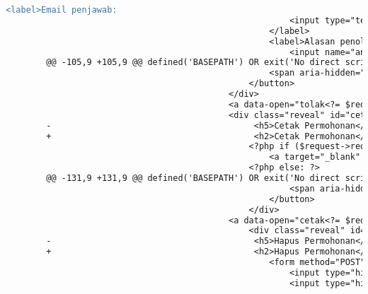 \begin{itemize}
\begin{lstlisting}[frame=single, label={lst:perbaikan_1.3.1_tag_heading}, language=diff, caption=Perbaikan Kriteria Sukses 1.3.1 - Penggunaan \textit{Heading} Tidak Tepat]
                                                    <label>Email penjawab:
                                                        <input type="text" value="<?= $answeredByEmail ?>" readonly="true"/>
                                                    </label>
                                                    <label>Alasan penolakan:
                                                        <input name="answeredMessage" class="input-group-field" type="text" required/>
        @@ -105,9 +105,9 @@ defined('BASEPATH') OR exit('No direct script access allowed');
                                                    <span aria-hidden="true">&times;</span>
                                                </button>
                                            </div>
                                            <a data-open="tolak<?= $request->id ?>"><i class="fi-dislike"></i></a>
                                            <div class="reveal" id="cetak<?= $request->id ?>" data-reveal>
        -                                        <h5>Cetak Permohonan</h5>
        +                                        <h2>Cetak Permohonan</h2>
                                                <?php if ($request->requestByNPM !== NULL): ?>
                                                    <a target="_blank" href="<?= sprintf($transkripURLs[$request->requestType], $request->requestByNPM) ?>">Klik untuk membuka DPS/LHS</a>
                                                <?php else: ?>
        @@ -131,9 +131,9 @@ defined('BASEPATH') OR exit('No direct script access allowed');
                                                        <span aria-hidden="true">&times;</span>
                                                    </button>
                                                </div>
                                            <a data-open="cetak<?= $request->id ?>"><i class="fi-print"></i></a>
                                                <div class="reveal" id="hapus<?= $request->id ?>" data-reveal>
        -                                        <h5>Hapus Permohonan</h5>
        +                                        <h2>Hapus Permohonan</h2>
                                                    <form method="POST" action="/TranskripManage/remove">
                                                        <input type="hidden" name="<?= $this->security->get_csrf_token_name() ?>" value="<?= $this->security->get_csrf_hash() ?>" />
                                                        <input type="hidden" name="id" value="<?= $request->id ?>"/>


\end{lstlisting}
\end{itemize}
